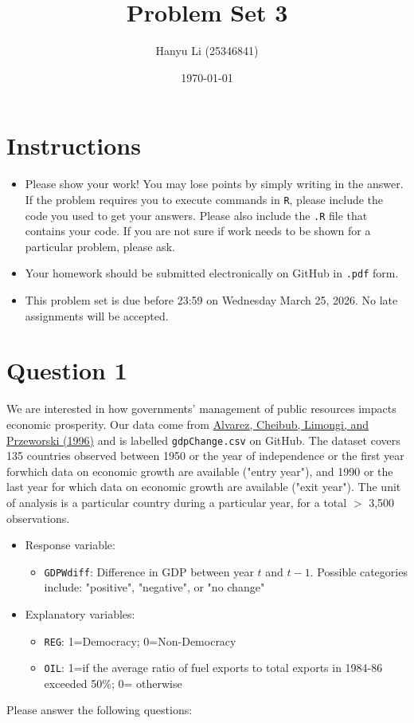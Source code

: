 \documentclass[12pt,letterpaper]{article}
\title{Problem Set 3}
\date{\today}
\author{Hanyu Li (25346841)}
\begin{document}
	\maketitle
	\section*{Instructions}
	\begin{itemize}
		\item Please show your work! You may lose points by simply writing in the answer. If the problem requires you to execute commands in \texttt{R}, please include the code you used to get your answers. Please also include the \texttt{.R} file that contains your code. If you are not sure if work needs to be shown for a particular problem, please ask.
		\item Your homework should be submitted electronically on GitHub in \texttt{.pdf} form.
		\item This problem set is due before 23:59 on Wednesday March 25, 2026. No late assignments will be accepted.
	\end{itemize}
	
	\vspace{.25cm}
	\section*{Question 1}
	\vspace{.25cm}
	\noindent We are interested in how governments' management of public resources impacts economic prosperity. Our data come from \href{https://www.researchgate.net/profile/Adam_Przeworski/publication/240357392_Classifying_Political_Regimes/links/0deec532194849aefa000000/Classifying-Political-Regimes.pdf}{Alvarez, Cheibub, Limongi, and Przeworski (1996)} and is labelled \texttt{gdpChange.csv} on GitHub. The dataset covers 135 countries observed between 1950 or the year of independence or the first year forwhich data on economic growth are available ("entry year"), and 1990 or the last year for which data on economic growth are available ("exit year"). The unit of analysis is a particular country during a particular year, for a total $>$ 3,500 observations. 
	
	\begin{itemize}
		\item
		Response variable: 
		\begin{itemize}
			\item \texttt{GDPWdiff}: Difference in GDP between year $t$ and $t-1$. Possible categories include: "positive", "negative", or "no change"
		\end{itemize}
		\item
		Explanatory variables: 
		\begin{itemize}
			\item
			\texttt{REG}: 1=Democracy; 0=Non-Democracy
			\item
			\texttt{OIL}: 1=if the average ratio of fuel exports to total exports in 1984-86 exceeded 50\%; 0= otherwise
		\end{itemize}
		
	\end{itemize}
	\newpage
	\noindent Please answer the following questions:
	
\end{document}
